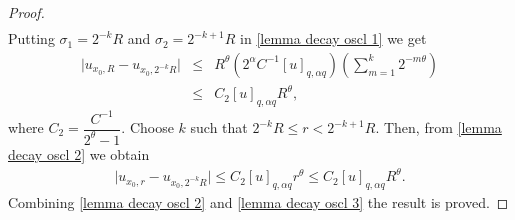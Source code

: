 \documentclass[10pt, leqno]{article}
\theoremstyle{definition}
\theoremstyle{remark}
\numberwithin{equation}{section}
\begin{document}
\begin{proof}
\begin{eqnarray}
\end{eqnarray}
Putting $\sigma_{1} = 2^{-k}R$ and $\sigma_{2} = 2^{-k+1}R$ in \eqref{lemma decay oscl 1} we get
\begin{eqnarray}
\label{lemma decay oscl 2}
\vert u_{x_{0}, R} - u_{x_{0}, 2^{-k}R} \vert & \leq & R^{\theta}\left(2^{\alpha}C^{-1} \left[ u \right]_{q, \alpha q} \right)\left( \sum_{m=1}^{k}2^{-m \theta} \right) \\ \nonumber
& \leq & C_{2}\left[ u \right]_{q, \alpha q}R^{\theta},
\end{eqnarray}
where $C_{2} = \dfrac{C^{-1}}{2^{\theta} -1}$. Choose $k$ such that $2^{-k}R \leq r < 2^{-k+1}R$. Then, from \eqref{lemma decay oscl 2} we obtain
\begin{eqnarray}
\label{lemma decay oscl 3}
\vert u_{x_{0}, r} - u_{x_{0}, 2^{-k}R} \vert  \leq  C_{2}\left[ u \right]_{q, \alpha q}r^{\theta} \leq C_{2}\left[ u \right]_{q, \alpha q}R^{\theta}.
\end{eqnarray}
Combining \eqref{lemma decay oscl 2} and \eqref{lemma decay oscl 3} the result is proved.
\end{proof}
\end{document}
